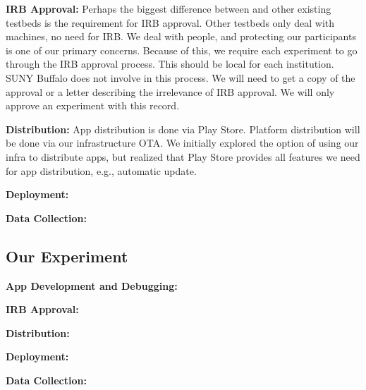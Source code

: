 {\bf IRB Approval:} Perhaps the biggest difference between \PhoneLab{} and other
existing testbeds is the requirement for IRB approval. Other testbeds only deal
with machines, no need for IRB. We deal with people, and protecting our
participants is one of our primary concerns. Because of this, we require each
experiment to go through the IRB approval process. This should be local for each
institution. SUNY Buffalo does not involve in this process. We will need to get
a copy of the approval or a letter describing the irrelevance of IRB approval.
We will only approve an experiment with this record.

{\bf Distribution:} App distribution is done via Play Store. Platform
distribution will be done via our infrastructure OTA. We initially explored the
option of using our infra to distribute apps, but realized that Play Store
provides all features we need for app distribution, e.g., automatic update. 

{\bf Deployment:}

{\bf Data Collection:}

\subsection{Our Experiment}

{\bf App Development and Debugging:}

{\bf IRB Approval:}

{\bf Distribution:}

{\bf Deployment:}

{\bf Data Collection:}

